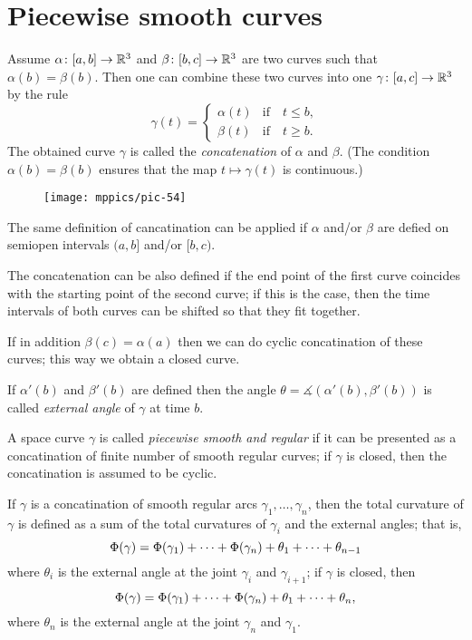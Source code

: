 \section*{Piecewise smooth curves}

Assume $\alpha\colon[a,b]\to \mathbb{R}^3$ and $\beta\:[b,c]\z\to \RR^3$ are two curves such that $\alpha(b)=\beta(b)$.
Then one can combine these two curves into one $\gamma\:[a,c]\z\to \RR^3$ by the rule 
\[\gamma(t)=
\begin{cases}
\alpha(t)&\text{if}\quad t\le b,
\\
\beta(t)&\text{if}\quad t\ge b.
\end{cases}
\]
The obtained curve $\gamma$ is called the 
\emph{concatenation} of $\alpha$ and $\beta$. %
(The condition $\alpha(b)=\beta(b)$ ensures that the map $t\mapsto\gamma(t)$ is continuous.)

\begin{wrapfigure}{r}{30 mm}
\vskip-0mm
\centering
\texttt{[image: mppics/pic-54]}
\end{wrapfigure}

The same definition of cancatination can be applied if $\alpha$ and/or $\beta$ are defied on semiopen intervals 
$(a,b]$ and/or $[b,c)$.

The concatenation can be also defined if the end point of the first curve coincides with the starting point of the second curve;
if this is the case, then the time intervals of both curves can be shifted so that they fit together. 

If in addition $\beta(c)=\alpha(a)$ then we can do cyclic concatination of these curves;
this way we obtain a closed curve.

If $\alpha'(b)$ and $\beta'(b)$ are defined then the angle $\theta=\measuredangle(\alpha'(b),\beta'(b))$ is called \emph{external angle} of $\gamma$ at time $b$.

A space curve $\gamma$ is called \emph{piecewise smooth and regular} if it can be presented as a concatination of finite number of smooth regular curves; if $\gamma$ is closed, then the  concatination is assumed to be cyclic.

If $\gamma$ is a concatination of smooth regular arcs $\gamma_1,\dots,\gamma_n$, then the total curvature of $\gamma$ is defined as a sum of the total curvatures of $\gamma_i$ and the external angles;
that is, 
\[\Phi({\gamma})=\Phi({\gamma_1})+\dots+\Phi({\gamma_n})+\theta_1+\dots+\theta_{n-1}\]
where $\theta_i$ is the external angle at the joint $\gamma_i$ and $\gamma_{i+1}$;
if $\gamma$ is closed, then 
\[\Phi({\gamma})=\Phi({\gamma_1})+\dots+\Phi({\gamma_n})+\theta_1+\dots+\theta_{n},\]
where $\theta_n$ is the external angle at the joint $\gamma_n$ and $\gamma_1$.

